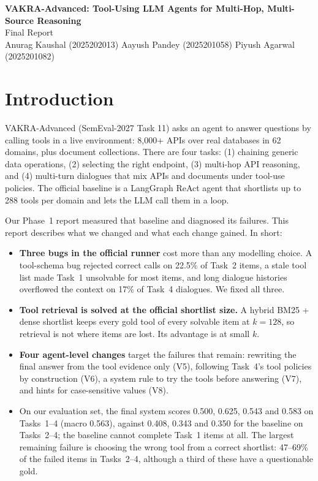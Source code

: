 \documentclass[10pt]{article}
\begin{document}
\begin{center}
{\fontsize{13}{16}\selectfont\bfseries VAKRA-Advanced: Tool-Using LLM Agents for Multi-Hop, Multi-Source Reasoning}\\[0.4em]
{\normalsize Final Report}\\[0.4em]
{\small Anurag Kaushal (2025202013) \quad Aayush Pandey (2025201058) \quad Piyush Agarwal (2025201082)}
\end{center}

\section{Introduction}
VAKRA-Advanced (SemEval-2027 Task 11) asks an agent to answer questions by calling tools in a
live environment: 8,000+ APIs over real databases in 62 domains, plus document collections.
There are four tasks: (1) chaining generic data operations, (2) selecting the right endpoint,
(3) multi-hop API reasoning, and (4) multi-turn dialogues that mix APIs and documents under
tool-use policies. The official baseline is a LangGraph ReAct agent that shortlists up to 288
tools per domain and lets the LLM call them in a loop.

Our Phase~1 report measured that baseline and diagnosed its failures. This report describes what
we changed and what each change gained. In short:
\begin{itemize}
\item \textbf{Three bugs in the official runner} cost more than any modelling choice. A tool-schema
  bug rejected correct calls on 22.5\% of Task~2 items, a stale tool list made Task~1 unsolvable
  for most items, and long dialogue histories overflowed the context on 17\% of Task~4 dialogues.
  We fixed all three.
\item \textbf{Tool retrieval is solved at the official shortlist size.} A hybrid BM25 + dense
  shortlist keeps every gold tool of every solvable item at $k{=}128$, so retrieval is not where
  items are lost. Its advantage is at small $k$.
\item \textbf{Four agent-level changes} target the failures that remain: rewriting the final answer
  from the tool evidence only (V5), following Task~4's tool policies by construction (V6), a
  system rule to try the tools before answering (V7), and hints for case-sensitive values (V8).
\item On our evaluation set, the final system scores 0.500, 0.625, 0.543 and 0.583 on Tasks~1--4
  (macro 0.563), against 0.408, 0.343 and 0.350 for the baseline on Tasks~2--4; the
  baseline cannot complete Task~1 items at all. The largest remaining failure is choosing the wrong tool from a correct shortlist:
  47--69\% of the failed items in Tasks~2--4, although a third of these have a questionable gold.
\end{itemize}
\end{document}
